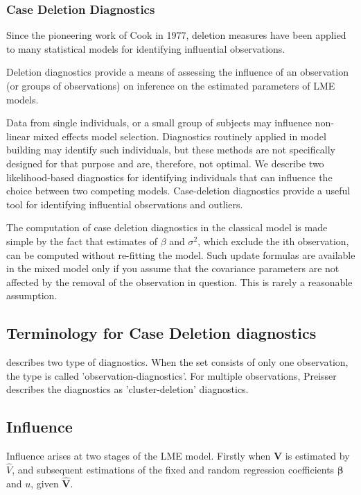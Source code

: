 \documentclass[Main.tex]{subfiles}
\begin{document}
	\newpage
	\subsubsection{Case Deletion Diagnostics}
		
	Since the pioneering work of Cook in 1977, deletion measures have been applied to many statistical models for identifying influential observations.
	
	Deletion diagnostics provide a means of assessing the influence of an observation (or groups of observations) on inference on the estimated parameters of LME models.
	
	Data from single individuals, or a small group of subjects may influence non-linear mixed effects model selection. Diagnostics routinely applied in model building may identify such individuals, but these methods are not specifically designed for that purpose and are, therefore, not optimal. We describe two likelihood-based diagnostics for identifying individuals that can influence the choice between two competing models.
	Case-deletion diagnostics provide a useful tool for identifying influential observations and outliers.
	
	The computation of case deletion diagnostics in the classical model is made simple by the fact that estimates of $\beta$ and $\sigma^2$, which exclude the ith observation, can be computed without re-fitting the model. Such update formulas are available in the mixed model only if you assume that the covariance parameters are not affected by the removal of the observation in question. This is rarely a reasonable assumption.
	
	\subsection{Terminology for Case Deletion diagnostics} %
	
	\citet{preisser} describes two type of diagnostics. When the set consists of only one observation, the type is called
	'observation-diagnostics'. For multiple observations, Preisser describes the diagnostics as 'cluster-deletion' diagnostics.
	
	
	\subsection{Influence}
	
	Influence arises at two stages of the LME model. Firstly when $\mathbf{V}$ is estimated by $\hat{V}$, and subsequent
	estimations of the fixed and random regression coefficients $\mathbf{\beta}$ and $u$, given $\mathbf{\hat{V}}$.
	
\end{document}
